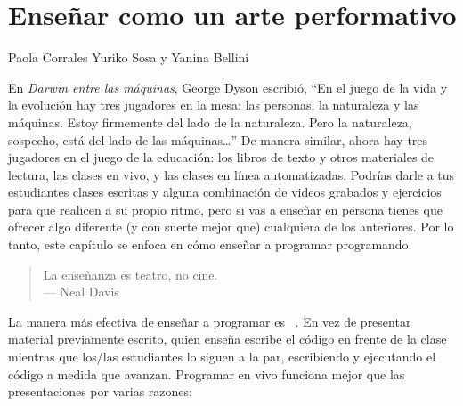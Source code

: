 \chapter{Enseñar como un arte performativo}\label{s:performance}

\begin{reveiwer}
{Paola Corrales}
{Yuriko Sosa y Yanina Bellini}
\end{reveiwer}

En \emph{Darwin entre las máquinas},
George Dyson escribió,
``En el juego de la vida y la evolución hay tres jugadores en la mesa:
las personas, la naturaleza y las máquinas.
Estoy firmemente del lado de la naturaleza.
Pero la naturaleza, sospecho, está del lado de las máquinas{\ldots}''
De manera similar, ahora hay tres jugadores en el juego de la educación:
los libros de texto y otros materiales de lectura,
las clases en vivo,
y las clases en línea automatizadas.
Podrías darle a tus estudiantes clases escritas y alguna combinación
de videos grabados y ejercicios para que realicen a su propio ritmo,
pero si vas a enseñar en persona tienes
que ofrecer algo diferente (y con suerte mejor que) cualquiera de los anteriores.
Por lo tanto, este capítulo se enfoca en cómo enseñar a programar programando.


\begin{quote}

  La enseñanza es teatro, no cine. \\
  --- Neal Davis

\end{quote}

La manera más efectiva de enseñar a programar es ~\cite{Rubi2013,Haar2017,Raj2018}.
En vez de presentar material previamente escrito,
quien enseña escribe el código en frente de la clase
mientras que los/las estudiantes lo siguen a la par,
escribiendo y ejecutando el código a medida que avanzan.
Programar en vivo funciona mejor que las presentaciones por varias razones:

